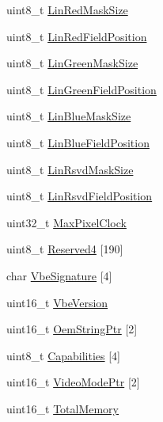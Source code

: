 \begin{DoxyCompactItemize}
\item 
uint8\+\_\+t \hyperlink{struct____attribute_____a88a5ced225c9ef7ed6ffe33e5a39edc6}{Lin\+Red\+Mask\+Size}
\item 
uint8\+\_\+t \hyperlink{struct____attribute_____aec8d45f188ac9210b88216af83de847d}{Lin\+Red\+Field\+Position}
\item 
uint8\+\_\+t \hyperlink{struct____attribute_____a5768a84391f8a26d8a9bfd6a22d5e49d}{Lin\+Green\+Mask\+Size}
\item 
uint8\+\_\+t \hyperlink{struct____attribute_____a5571b1959950d520f2b45bb5549994e3}{Lin\+Green\+Field\+Position}
\item 
uint8\+\_\+t \hyperlink{struct____attribute_____aa2b79b8eed8d842e0db481fb1fbb9a06}{Lin\+Blue\+Mask\+Size}
\item 
uint8\+\_\+t \hyperlink{struct____attribute_____a99e6b6bdbda9f98f2823429dfd5b5685}{Lin\+Blue\+Field\+Position}
\item 
uint8\+\_\+t \hyperlink{struct____attribute_____a577b5892a22d06e230f528a62a472d1d}{Lin\+Rsvd\+Mask\+Size}
\item 
uint8\+\_\+t \hyperlink{struct____attribute_____a012126db503ad1281ae53aa41f4c96a7}{Lin\+Rsvd\+Field\+Position}
\item 
uint32\+\_\+t \hyperlink{struct____attribute_____afd81a69353c35e8b1fb9b696931f79a5}{Max\+Pixel\+Clock}
\item 
uint8\+\_\+t \hyperlink{struct____attribute_____ab859fb715f83f005dfa2f13d8b0e4ff0}{Reserved4} \mbox{[}190\mbox{]}
\item 
char \hyperlink{struct____attribute_____a9f5c2950d459303bbc740109d3e0c474}{Vbe\+Signature} \mbox{[}4\mbox{]}
\item 
uint16\+\_\+t \hyperlink{struct____attribute_____ab50a7a6ed578c30d9411db043c0b34c9}{Vbe\+Version}
\item 
uint16\+\_\+t \hyperlink{struct____attribute_____a5a097456359234e9d2ed119aec00fba4}{Oem\+String\+Ptr} \mbox{[}2\mbox{]}
\item 
uint8\+\_\+t \hyperlink{struct____attribute_____a03972171b961723d316eb382e40a7409}{Capabilities} \mbox{[}4\mbox{]}
\item 
uint16\+\_\+t \hyperlink{struct____attribute_____a135a4de316befee6c1415c22e5636f15}{Video\+Mode\+Ptr} \mbox{[}2\mbox{]}
\item 
uint16\+\_\+t \hyperlink{struct____attribute_____a5659e88b961bf423d6385f315264e005}{Total\+Memory}
\end{DoxyCompactItemize}


